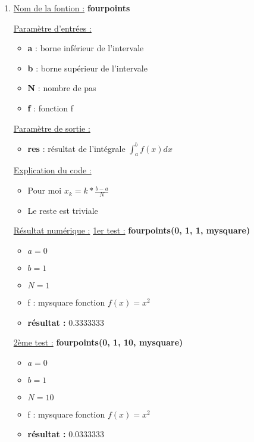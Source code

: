 \documentclass{article}
\begin{document}
\begin{enumerate}
\item
  \underline{Nom de la fontion :} \textbf{fourpoints} \newline
  
  \underline{Paramètre d'entrées :}
  \begin{itemize}
  \item \textbf{a} : borne inférieur de l'intervale
  \item \textbf{b} : borne supérieur de l'intervale
  \item \textbf{N} : nombre de pas
  \item \textbf{f} : fonction f
  \end{itemize}

  \underline{Paramètre de sortie :}
  \begin{itemize}
  \item \textbf{res} : résultat de l'intégrale $\int_a^b {f(x) dx}$
  \end{itemize}

  \underline{Explication du code :} \newline
  
  \begin{itemize}
  \item Pour moi $x_k = k * \frac{b - a}{N}$
  \item Le reste est triviale
  \end{itemize}

  \underline{Résultat numérique :} \newline\newline
  \underline{1er test :} \textbf{fourpoints(0, 1, 1, mysquare)}

  \begin{itemize}
  \item $ a = 0 $
  \item $ b = 1 $
  \item $ N = 1 $
  \item f : mysquare fonction $f(x) = x^2$
  \item \textbf{résultat :} $0.3333333$
  \end{itemize}

  \underline{2ème test :} \textbf{fourpoints(0, 1, 10, mysquare)}

  \begin{itemize}
  \item $ a = 0 $
  \item $ b = 1 $
  \item $ N = 10 $
  \item f : mysquare fonction $f(x) = x^2$
  \item \textbf{résultat :} $0.0333333$
  \end{itemize}

\end{enumerate}
\end{document}
